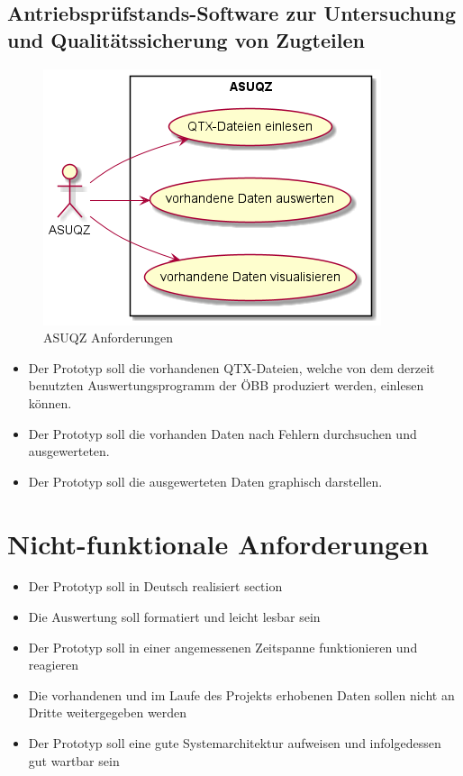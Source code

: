 \subsection{Antriebsprüfstands-Software zur Untersuchung und Qualitätssicherung von Zugteilen}
\begin{figure}[h]
    \centering
    \includegraphics{pics/asuqz_anforderungen.png}
    \caption{ASUQZ Anforderungen}
    \label{fig:asuqz_anforderungen}
\end{figure}
\begin{itemize}
    \item Der Prototyp soll die vorhandenen QTX-Dateien, welche von dem derzeit benutzten Auswertungsprogramm der ÖBB produziert werden,
    einlesen können.
    \item Der Prototyp soll die vorhanden Daten nach Fehlern durchsuchen und ausgewerteten.
    \item Der Prototyp soll die ausgewerteten Daten graphisch darstellen.
\end{itemize}

\section{Nicht-funktionale Anforderungen}
\begin{itemize}
    \item Der Prototyp soll in Deutsch realisiert section
    \item Die Auswertung soll formatiert und leicht lesbar sein
    \item Der Prototyp soll in einer angemessenen Zeitspanne funktionieren und reagieren
    \item Die vorhandenen und im Laufe des Projekts erhobenen Daten sollen nicht an Dritte weitergegeben werden
    \item Der Prototyp soll eine gute Systemarchitektur aufweisen und infolgedessen gut wartbar sein
\end{itemize}

